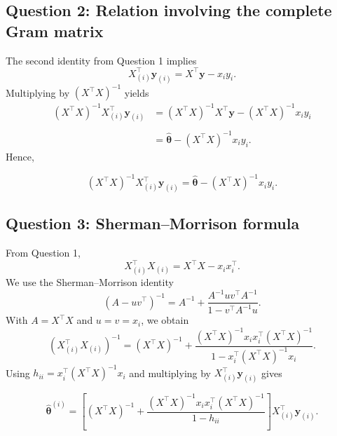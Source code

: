 \documentclass[11pt,a4paper]{article}
\newcommand{\thetahat}{\widehat{\bm\theta}}
\begin{document}
\subsection{Question 2: Relation involving the complete Gram matrix}
The second identity from Question 1 implies
\[
    X_{(i)}^\top\bm y_{(i)}=X^\top\bm y-x_iy_i.
\]
Multiplying by $(X^\top X)^{-1}$ yields
\begin{align*}
    (X^\top X)^{-1}X_{(i)}^\top\bm y_{(i)}
    &=(X^\top X)^{-1}X^\top\bm y
      -(X^\top X)^{-1}x_iy_i \\\\
    &=\thetahat-(X^\top X)^{-1}x_iy_i.
\end{align*}
Hence,
\begin{resultbox}
\[
    \boxed{
    (X^\top X)^{-1}X_{(i)}^\top\bm y_{(i)}
    =\thetahat-(X^\top X)^{-1}x_iy_i
    }.
\]
\end{resultbox}
\subsection{Question 3: Sherman--Morrison formula}
From Question 1,
\[
    X_{(i)}^\top X_{(i)}=X^\top X-x_ix_i^\top.
\]
We use the Sherman--Morrison identity
\[
    (A-uv^\top)^{-1}
    =A^{-1}+\frac{A^{-1}uv^\top A^{-1}}
                    {1-v^\top A^{-1}u}.
\]
With $A=X^\top X$ and $u=v=x_i$, we obtain
\[
    \left(X_{(i)}^\top X_{(i)}\right)^{-1}
    =(X^\top X)^{-1}
    +\frac{(X^\top X)^{-1}x_ix_i^\top(X^\top X)^{-1}}
           {1-x_i^\top(X^\top X)^{-1}x_i}.
\]
Using $h_{ii}=x_i^\top(X^\top X)^{-1}x_i$ and multiplying by
$X_{(i)}^\top\bm y_{(i)}$ gives
\begin{resultbox}
\[
\boxed{
\widehat{\bm\theta}^{(i)}
=\left[
  (X^\top X)^{-1}
  +\frac{(X^\top X)^{-1}x_ix_i^\top(X^\top X)^{-1}}
         {1-h_{ii}}
 \right]X_{(i)}^\top\bm y_{(i)}
}.
\]
\end{resultbox}
\end{document}
